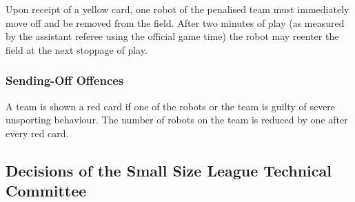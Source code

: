 Upon receipt of a yellow card, one robot of the penalised team must immediately move off and be removed from the field.
After two minutes of play (as measured by the assistant referee using the official game time) the robot may reenter the field at the next stoppage of play.

\subsubsection{Sending-Off Offences}
A team is shown a red card if one of the robots or the team is guilty of severe unsporting behaviour.
The number of robots on the team is reduced by one after every red card.

\subsection*{Decisions of the Small Size League Technical Committee}
